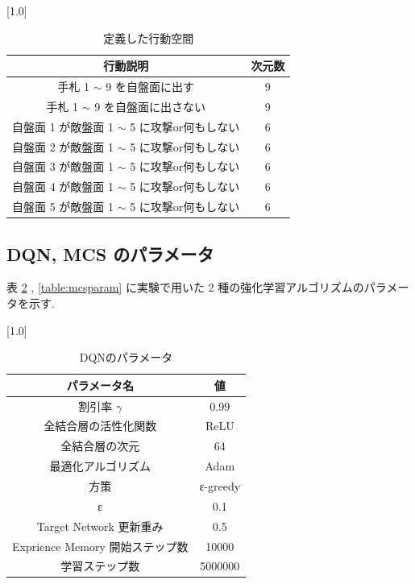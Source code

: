 \documentclass[twocolumn]{jarticle}
\begin{document}
  \begin{table}[t]
    \centering
    \caption{定義した行動空間}
    \vspace{-0.3cm}
    \label{table:action}
    \scalebox{1.0}[1.0]{
      \begin{tabular}{|c|c|}
        \hline
        行動説明                          & 次元数        \\ \hline \hline
        手札 1 $\sim$ 9 を自盤面に出す             & 9          \\ \hline
        手札 1 $\sim$ 9 を自盤面に出さない & 9 \\ \hline
        自盤面 1 が敵盤面 1 $\sim$ 5 に攻撃or何もしない    & 6          \\ \hline
        自盤面 2 が敵盤面 1 $\sim$ 5 に攻撃or何もしない    & 6          \\ \hline
        自盤面 3 が敵盤面 1 $\sim$ 5 に攻撃or何もしない    & 6          \\ \hline
        自盤面 4 が敵盤面 1 $\sim$ 5 に攻撃or何もしない    & 6          \\ \hline
        自盤面 5 が敵盤面 1 $\sim$ 5 に攻撃or何もしない    & 6          \\ \hline
        \end{tabular}
    }
    \end{table}
  
  \subsection{DQN, MCS のパラメータ}
  表 \ref{table:dqnparam} , \ref{table:mcsparam} に実験で用いた 2 種の強化学習アルゴリズムのパラメータを示す.
  \begin{table}[t]
    \centering
    \caption{DQNのパラメータ}
    \vspace{-0.3cm}
    \label{table:dqnparam}
    \scalebox{1.0}[1.0]{
      \begin{tabular}{|c|c|}
        \hline
        パラメータ名 & 値 \\ \hline \hline
        割引率 $\gamma$ & 0.99 \\ \hline     
        全結合層の活性化関数             & ReLU     \\ \hline
        全結合層の次元                & 64       \\ \hline
        最適化アルゴリズム              & Adam     \\ \hline
        方策                 & ε-greedy \\ \hline
        ε & 0.1 \\ \hline  
        Target Network 更新重み              & 0.5     \\ \hline
        Exprience Memory 開始ステップ数 & 10000 \\ \hline
        学習ステップ数 & 5000000 \\ \hline
        \end{tabular}
    }
    \end{table}
  
\end{document}
